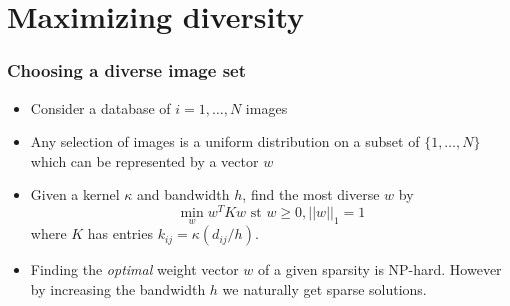 \documentclass{beamer}
\begin{document}
\section{Maximizing diversity}

\frame{\sectionpage}

\begin{frame}
\frametitle{Choosing a diverse image set}
\begin{itemize}
\item Consider a database of $i = 1, \hdots, N$ images
\item Any selection of images is a uniform distribution on a subset of
$\{1, \hdots, N\}$ which can be represented by a vector $w$
\item Given a kernel $\kappa$ and bandwidth $h$, find the most diverse $w$ by
\[
\min_w w^T K w \text{ st }w \geq 0, ||w||_1 = 1
\]
where $K$ has entries $k_{ij} = \kappa(d_{ij}/h)$.
\item Finding the \emph{optimal} weight vector $w$ of a given sparsity
  is NP-hard.
However by increasing the bandwidth $h$ we naturally get sparse solutions.
\end{itemize}
\end{frame}
\end{document}
